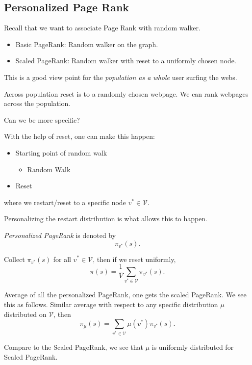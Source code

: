 \subsection{Personalized Page Rank}
\begin{prev}
	Recall that we want to associate Page Rank with random walker.
	\begin{itemize}
		\item Basic PageRank: Random walker on the graph.
		\item Scaled PageRank: Random walker with reset to a uniformly chosen node.
	\end{itemize}
	This is a good view point for the \emph{population as a whole} user surfing the webs.
\end{prev}

\hr

Across population reset is to a randomly chosen webpage. We can rank webpages across the population.

\begin{problem}
Can we be more specific?
\end{problem}

\begin{answer}
	With the help of reset, one can make this happen:
	\begin{itemize}
		\item Starting point of random walk
		      \begin{itemize}
			      \item Random Walk
		      \end{itemize}
		\item Reset
	\end{itemize}
	where we restart/reset to a specific node \(v^{*}\in \mathcal{V}\).
	\begin{remark}
		Personalizing the restart distribution is what allows this to happen.
	\end{remark}
\end{answer}

\begin{definition}
	\emph{Personalized PageRank} is denoted by
	\[
		\pi_{v^{*}}(s).
	\]
\end{definition}
Collect \(\pi_{v^{*}}(s)\) for all \(v^{*}\in\mathcal{V}\), then if we reset uniformly,
\[
	\pi(s) = \frac{1}{V}\sum\limits_{v^{*}\in\mathcal{V}} \pi_{v^{*}}(s).
\]

\begin{remark}
	Average of all the personalized PageRank, one gets the scaled PageRank. We see this as follows.
	Similar average with respect to any specific distribution \(\mu\) distributed on \(\mathcal{V}\), then
	\[
		\pi_\mu(s) = \sum\limits_{v^{*}\in \mathcal{V}} \mu(v^{*})\pi_{v^{*}}(s).
	\]

	Compare to the Scaled PageRank, we see that \(\mu\) is uniformly distributed for Scaled PageRank.
\end{remark}

